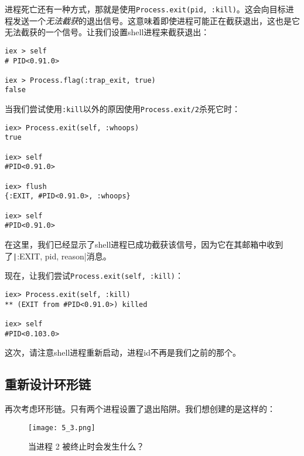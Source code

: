 进程死亡还有一种方式，那就是使用\texttt{Process.exit(pid, :kill)}。这会向目标进程发送一个\emph{无法截获}的退出信号。这意味着即使进程可能正在截获退出，这也是它无法截获的一个信号。让我们设置shell进程来截获退出：

\begin{code}{}
\begin{verbatim}
iex > self
# PID<0.91.0>

iex > Process.flag(:trap_exit, true)
false
\end{verbatim}
\end{code}

当我们尝试使用\texttt{:kill}以外的原因使用\texttt{Process.exit/2}杀死它时：

\begin{code}{}
\begin{verbatim}
iex> Process.exit(self, :whoops)
true

iex> self
#PID<0.91.0>

iex> flush
{:EXIT, #PID<0.91.0>, :whoops}

iex> self
#PID<0.91.0>
\end{verbatim}
\end{code}

在这里，我们已经显示了shell进程已成功截获该信号，因为它在其邮箱中收到了\texttt|{:EXIT, pid, reason}|消息。

现在，让我们尝试\texttt{Process.exit(self, :kill)}：

\begin{code}{}
\begin{verbatim}
iex> Process.exit(self, :kill)
** (EXIT from #PID<0.91.0>) killed

iex> self
#PID<0.103.0>
\end{verbatim}
\end{code}

这次，请注意shell进程重新启动，进程id不再是我们之前的那个。

\subsection{重新设计环形链}

再次考虑环形链。只有两个进程设置了退出陷阱。我们想创建的是这样的：

\begin{figure}[!ht]
    \centering
    \texttt{[image: 5\_3.png]}
    \caption{当进程 2 被终止时会发生什么？}
    \label{fig:5_3}
\end{figure}


